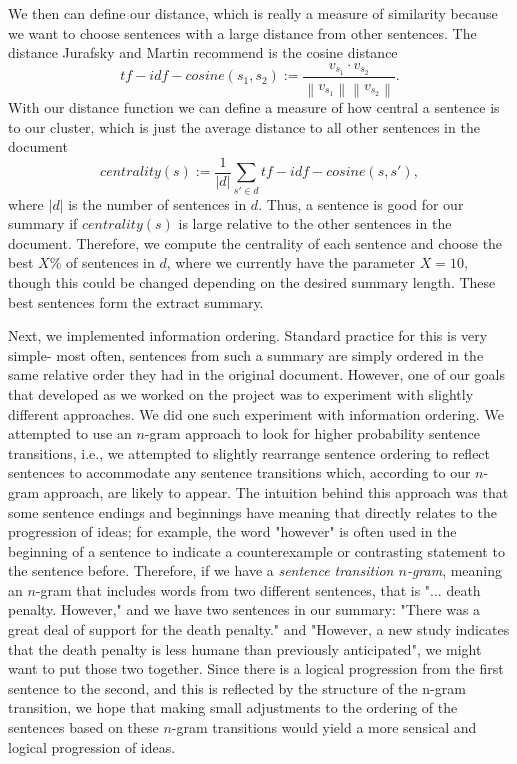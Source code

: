 \documentclass[12pt]{article}
\theoremstyle{plain}
\theoremstyle{definition}
\theoremstyle{remark}
\theoremstyle{plain}
\newcommand{\norm}[1]{\left\lVert #1 \right\rVert}
\begin{document}
We then can define our distance, which is really a measure of similarity because we want to choose sentences with a large distance from other sentences. The distance Jurafsky and Martin recommend is the cosine distance
$$tf-idf-cosine(s_1,s_2) := \frac{ v_{s_1} \cdot v_{s_2}}{\norm{v_{s_1}}\norm{v_{s_2}}}.$$
With our distance function we can define a measure of how central a sentence is to our cluster, which is just the average distance to all other sentences in the document
$$centrality(s) := \frac{1}{|d|}\sum_{s'\in d} tf-idf-cosine(s,s'),$$
where $|d|$ is the number of sentences in $d$. Thus, a sentence is good for our summary if $centrality(s)$ is large relative to the other sentences in the document. Therefore, we compute the centrality of each sentence and choose the best $X$\% of sentences in $d$, where we currently have the parameter $X=10$, though this could be changed depending on the desired summary length. These best sentences form the extract summary.


	Next, we implemented information ordering. Standard practice for this is very simple- most often, sentences from such a summary are simply ordered in the same relative order they had in the original document. However, one of our goals that developed as we worked on the project was to experiment with slightly different approaches. We did one such experiment with information ordering. We attempted to use an $n$-gram approach to look for higher probability sentence transitions, i.e., we attempted to slightly rearrange sentence ordering to reflect sentences to accommodate any sentence transitions which, according to our $n$-gram approach, are likely to appear. 
The intuition behind this approach was that some sentence endings and beginnings have meaning that directly relates to the progression of ideas; for example, the word "however" is often used in the beginning of a sentence to indicate a counterexample or contrasting statement to the sentence before. Therefore, if we have a \emph{sentence transition $n$-gram}, meaning an $n$-gram that includes words from two different sentences, that is "... death penalty. However," and we have two sentences in our summary: "There was a great deal of support for the death penalty." and "However, a new study indicates that the death penalty is less humane than previously anticipated", we might want to put those two together. Since there is a logical progression from the first sentence to the second, and this is reflected by the structure of the n-gram transition, we hope that making small adjustments to the ordering of the sentences based on these $n$-gram transitions would yield a more sensical and logical progression of ideas. 
\end{document}
